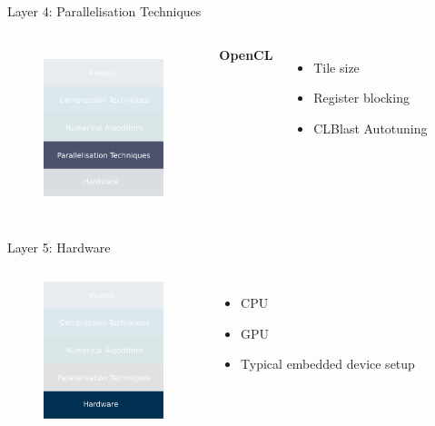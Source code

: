 \documentclass[xcolor=dvipsnames]{beamer}
\begin{document}
\begin{frame}{Layer 4: Parallelisation Techniques}

\begin{columns}


\begin{figure}
    \centering
    \includegraphics[width=3.5cm]{images/parallelisations.pdf}
    \label{fig:inference-stack-parallels-2}
\end{figure}


\textbf{OpenCL}
\begin{itemize}
    \item Tile size
    \item Register blocking 
    \item CLBlast Autotuning 
\end{itemize}

\end{columns}

\end{frame}



\begin{frame}{Layer 5: Hardware}

\begin{columns}


\begin{figure}
    \centering
    \includegraphics[width=3.5cm]{images/hardwares.pdf}
\end{figure}


\begin{itemize}
    \item CPU
    \item GPU
    \item Typical embedded device setup
\end{itemize}
\end{columns}


\end{frame}
\end{document}
